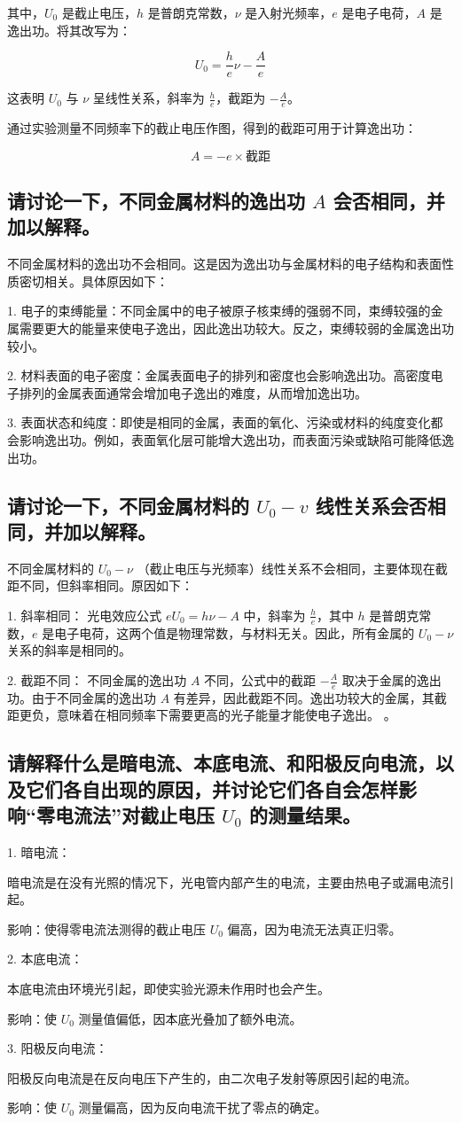 \documentclass[signature=data]{physicsreport}
\begin{document}
其中，$U_0$ 是截止电压，$h$ 是普朗克常数，$\nu$ 是入射光频率，$e$ 是电子电荷，$A$ 是逸出功。将其改写为：

$$
U_0 = \frac{h}{e} \nu - \frac{A}{e}
$$

这表明 $U_0$ 与 $\nu$ 呈线性关系，斜率为 $\frac{h}{e}$，截距为 $-\frac{A}{e}$。

通过实验测量不同频率下的截止电压作图，得到的截距可用于计算逸出功：

$$
A = -e \times \text{截距}
$$
\subsection{请讨论一下，不同金属材料的逸出功 $A$ 会否相同，并加以解释。}

不同金属材料的逸出功不会相同。这是因为逸出功与金属材料的电子结构和表面性质密切相关。具体原因如下：

1. 电子的束缚能量：不同金属中的电子被原子核束缚的强弱不同，束缚较强的金属需要更大的能量来使电子逸出，因此逸出功较大。反之，束缚较弱的金属逸出功较小。

2. 材料表面的电子密度：金属表面电子的排列和密度也会影响逸出功。高密度电子排列的金属表面通常会增加电子逸出的难度，从而增加逸出功。

3. 表面状态和纯度：即使是相同的金属，表面的氧化、污染或材料的纯度变化都会影响逸出功。例如，表面氧化层可能增大逸出功，而表面污染或缺陷可能降低逸出功。



\subsection{请讨论一下，不同金属材料的 $U_0-v$ 线性关系会否相同，并加以解释。}

不同金属材料的 \( U_0 - \nu \) （截止电压与光频率）线性关系不会相同，主要体现在截距不同，但斜率相同。原因如下：

1. 斜率相同：
光电效应公式 \( e U_0 = h \nu - A \) 中，斜率为 \( \frac{h}{e} \)，其中 \( h \) 是普朗克常数，\( e \) 是电子电荷，这两个值是物理常数，与材料无关。因此，所有金属的 \( U_0 - \nu \) 关系的斜率是相同的。

2. 截距不同：
不同金属的逸出功 \( A \) 不同，公式中的截距 \( -\frac{A}{e} \) 取决于金属的逸出功。由于不同金属的逸出功 \( A \) 有差异，因此截距不同。逸出功较大的金属，其截距更负，意味着在相同频率下需要更高的光子能量才能使电子逸出。
。

\subsection{请解释什么是暗电流、本底电流、和阳极反向电流，以及它们各自出现的原因，并讨论它们各自会怎样影响“零电流法”对截止电压 $U_0$ 的测量结果。}

1. 暗电流：

暗电流是在没有光照的情况下，光电管内部产生的电流，主要由热电子或漏电流引起。

影响：使得零电流法测得的截止电压 \( U_0 \) 偏高，因为电流无法真正归零。

2. 本底电流：

本底电流由环境光引起，即使实验光源未作用时也会产生。

影响：使 \( U_0 \) 测量值偏低，因本底光叠加了额外电流。

3. 阳极反向电流：

阳极反向电流是在反向电压下产生的，由二次电子发射等原因引起的电流。

影响：使 \( U_0 \) 测量偏高，因为反向电流干扰了零点的确定。
\end{document}
